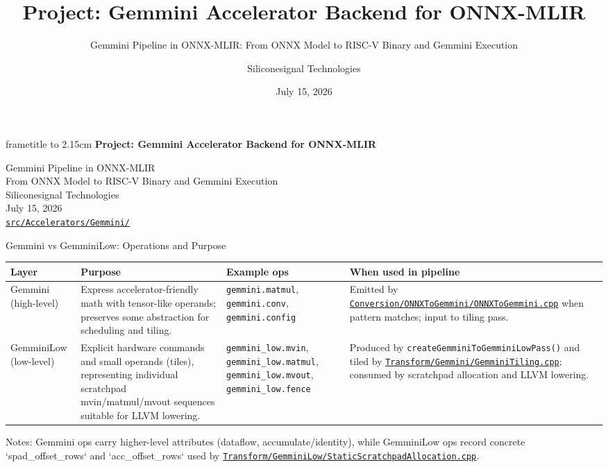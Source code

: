 \documentclass[aspectratio=169,10pt]{beamer}
\title[Gemmini Backend Project]{Project: Gemmini Accelerator Backend for ONNX-MLIR}
\subtitle{Gemmini Pipeline in ONNX-MLIR: From ONNX Model to RISC-V Binary and Gemmini Execution}
\author{Siliconesignal Technologies}
\institute{}
\date{July 15, 2026}
\newcommand{\code}[1]{\texttt{\footnotesize #1}}
\newcommand{\repoRoot}{/home/lahcen/toolchains/onnx-mlir-xcompile/onnx-mlir}
\newcommand{\pathcode}[1]{\href{run:\repoRoot/#1}{\texttt{\scriptsize #1}}}
\begin{document}
\begin{frame}[plain]
  \vspace*{1.95cm}
  \begin{beamercolorbox}[wd=\paperwidth,ht=2.15cm,dp=0cm,center]{frametitle}
    \vbox to 2.15cm{\vfil
      {\Large\bfseries Project: Gemmini Accelerator Backend for ONNX-MLIR}
    \vfil}
  \end{beamercolorbox}
  \vspace{0.65cm}
  \begin{center}
    {\large Gemmini Pipeline in ONNX-MLIR}\\[0.35cm]
    {\normalsize From ONNX Model to RISC-V Binary and Gemmini Execution}\\[0.9cm]
    {\large Siliconesignal Technologies}\\[0.25cm]
    {\normalsize July 15, 2026}\\[0.75cm]
    \pathcode{src/Accelerators/Gemmini/}
  \end{center}
\end{frame}

\begin{frame}{Gemmini vs GemminiLow: Operations and Purpose}
  \scriptsize
  \begin{tabularx}{\textwidth}{@{}lXXX@{}}
    \toprule
    Layer & Purpose & Example ops & When used in pipeline \\
    \midrule
    Gemmini (high-level) & Express accelerator-friendly math with tensor-like operands; preserves
      some abstraction for scheduling and tiling. & \code{gemmini.matmul}, \code{gemmini.conv}, \code{gemmini.config} & Emitted by \pathcode{Conversion/ONNXToGemmini/ONNXToGemmini.cpp} when pattern matches; input to tiling pass. \\
    GemminiLow (low-level) & Explicit hardware commands and small operands (tiles), representing
      individual scratchpad mvin/matmul/mvout sequences suitable for LLVM lowering. & \code{gemmini_low.mvin}, \code{gemmini_low.matmul}, \code{gemmini_low.mvout}, \code{gemmini_low.fence} & Produced by \code{createGemminiToGemminiLowPass()} and tiled by \pathcode{Transform/Gemmini/GemminiTiling.cpp}; consumed by scratchpad allocation and LLVM lowering. \\
    \bottomrule
  \end{tabularx}
  \vspace{0.5em}
  {\tiny Notes: Gemmini ops carry higher-level attributes (dataflow, accumulate/identity), while GemminiLow ops record concrete `spad_offset_rows` and `acc_offset_rows` used by \pathcode{Transform/GemminiLow/StaticScratchpadAllocation.cpp}.}
\end{frame}
\end{document}
